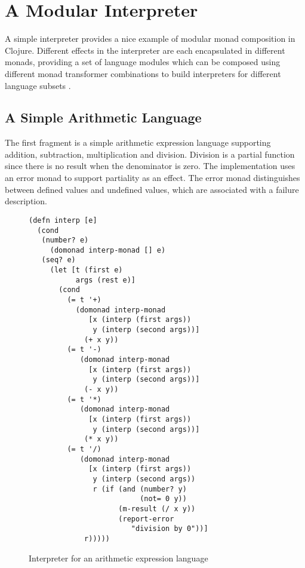 \documentclass[natbib,10pt]{sigplanconf}
\begin{document}
\section{A Modular Interpreter}

A simple interpreter provides a nice example of modular monad
composition in Clojure.  Different effects in the interpreter are each
encapsulated in different monads, providing a set of language modules
which can be composed using different monad transformer combinations
to build interpreters for different language subsets
\citep{modular-interpreters, semantic-lego}.

\subsection {A Simple Arithmetic Language}

The first fragment is a simple arithmetic expression language
supporting addition, subtraction, multiplication and division.
Division is a partial function since there is no result when the
denominator is zero.  The implementation uses an error monad to
support partiality as an effect.  The error monad distinguishes
between defined values and undefined values, which are associated
with a failure description.

\begin{figure}
\begin{center}
\begin{verbatim}
(defn interp [e]
  (cond
   (number? e) 
     (domonad interp-monad [] e)
   (seq? e)    
     (let [t (first e)
           args (rest e)]
       (cond
         (= t '+) 
           (domonad interp-monad
              [x (interp (first args))
               y (interp (second args))]
             (+ x y))
         (= t '-) 
            (domonad interp-monad
              [x (interp (first args))
               y (interp (second args))]
             (- x y))
         (= t '*) 
            (domonad interp-monad
              [x (interp (first args))
               y (interp (second args))]
             (* x y))
         (= t '/) 
            (domonad interp-monad
              [x (interp (first args))
               y (interp (second args))
               r (if (and (number? y) 
                          (not= 0 y))
                     (m-result (/ x y))
                     (report-error 
                        "division by 0"))]
             r)))))
\end{verbatim}
\end{center}
\caption{Interpreter for an arithmetic expression language}
\label{fig-interp-0}
\end{figure}
\end{document}
